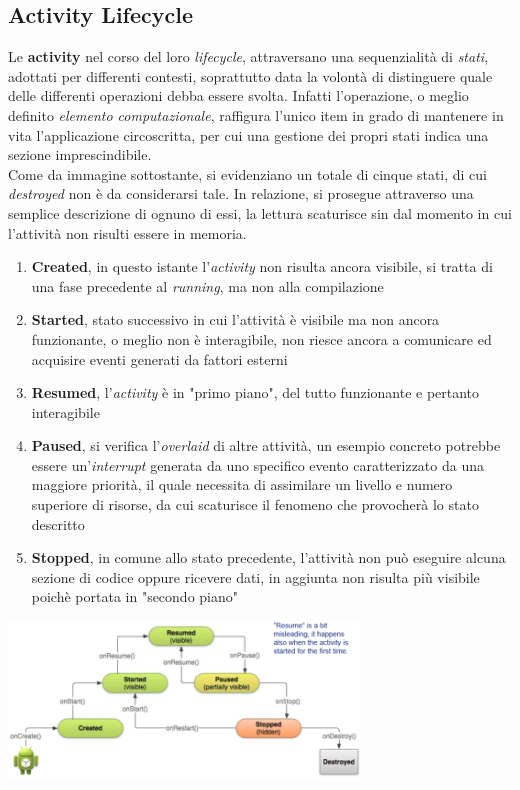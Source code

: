 \documentclass{article}
\begin{document}
\subsection*{Activity Lifecycle} 
Le \textbf{activity} nel corso del loro \textit{lifecycle}, attraversano una sequenzialità di \textit{stati}, adottati per differenti contesti, soprattutto data la volontà di distinguere quale delle differenti operazioni debba essere svolta. Infatti l'operazione, o meglio definito \textit{elemento computazionale}, raffigura l'unico item in grado di mantenere in vita l'applicazione circoscritta, per cui una gestione dei propri stati indica una sezione imprescindibile.\vspace*{14pt}\\
Come da immagine sottostante, si evidenziano un totale di cinque stati, di cui \textit{destroyed} non è da considerarsi tale. In relazione, si prosegue attraverso una semplice descrizione di ognuno di essi, la lettura scaturisce sin dal momento in cui l'attività non risulti essere in memoria.
\begin{enumerate}
  \renewcommand{\labelenumi}{-}
  \item \textbf{Created}, in questo istante l'\textit{activity} non risulta ancora visibile, si tratta di una fase precedente al \textit{running}, ma non alla compilazione
  \item \textbf{Started}, stato successivo in cui l'attività è visibile ma non ancora funzionante, o meglio non è interagibile, non riesce ancora a comunicare ed acquisire eventi generati da fattori esterni
  \item \textbf{Resumed}, l'\textit{activity} è in "primo piano", del tutto funzionante e pertanto interagibile
  \item \textbf{Paused}, si verifica l'\textit{overlaid} di altre attività, un esempio concreto potrebbe essere un'\textit{interrupt} generata da uno specifico evento caratterizzato da una maggiore priorità, il quale necessita di assimilare un livello e numero superiore di risorse, da cui scaturisce il fenomeno che provocherà lo stato descritto
  \item \textbf{Stopped}, in comune allo stato precedente, l'attività non può eseguire alcuna sezione di codice oppure ricevere dati, in aggiunta non risulta più visibile poichè portata in "secondo piano"
\end{enumerate}   
\begin{center}
  \includegraphics[width=0.7\textwidth]{foto1.png}
\end{center}
\end{document}
